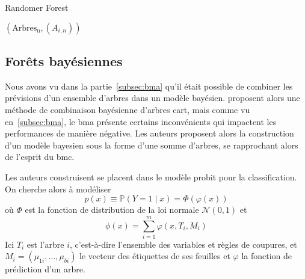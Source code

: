 \begin{algorithm}
\caption{Randomer Forest} \label{randomer.forest.alg}
\begin{algorithmic}
        \EndFor
    \EndFor
    \State \Return $\left(\mathrm{Arbres_n},\left( A_{i,n} \right) \right)$
    \EndProcedure
\end{algorithmic}    
\end{algorithm}

\subsection{Forêts bayésiennes}

Nous avons vu dans la partie~\ref{subsec:bma} qu'il était possible de combiner les prévisions d'un ensemble d'arbres dans un modèle bayésien. \citet{Chipman1998} proposent alors une méthode de combinaison bayésienne d'arbres \ac{cart}, mais comme vu en~\ref{subsec:bma}, le \ac{bma} présente certains inconvénients qui impactent les performances de manière négative.
Les auteurs proposent alors \citep{Chipman2008} la construction d'un modèle bayesien sous la forme d'une somme d'arbres, se rapprochant alors de l'esprit du \ac{bmc}.

Les auteurs construisent se placent dans le modèle probit pour la classification. On cherche alors à modéliser
\begin{equation}\label{equ:probleme.probit.bart}
    p(x) \equiv \mathbb{P} \left( Y = 1 \mid x \right) = \Phi ( \varphi(x)  ) 
\end{equation}
où $\Phi$ est la fonction de distribution de la loi normale $\mathcal{N} (0,1)$ et
\begin{equation*}
    \phi (x) = \sum_{i=1}^m \varphi (x,T_i,M_i)
\end{equation*}
Ici $T_i$ est l'arbre $i$, c'est-à-dire l'ensemble des variables et règles de coupures, et $M_i = (\mu_{1i},\dotsc,\mu_{bi})$ le vecteur des étiquettes de ses feuilles et $\varphi$ la fonction de prédiction d'un arbre.

